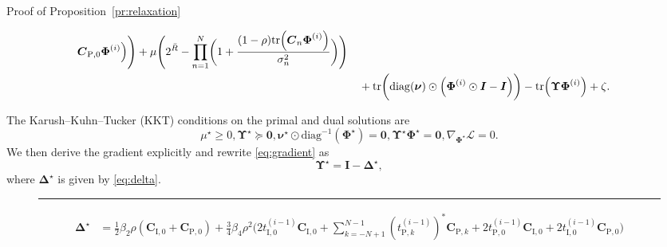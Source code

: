 \documentclass[journal]{IEEEtran}
\begin{document}
\begin{appendix}
\begin{subsection}{Proof of Proposition~\ref{pr:relaxation}}
\begin{figure}[!b]
\begin{align}
							\boldsymbol{C}_{\mathrm{P},0} \boldsymbol{\Phi}^{(i)}
						\Bigr)
						\Biggr) + \mu \Biggl(
						2^{\bar{R}} - \prod_{n=1}^N \biggl(
							1 + \frac{(1-\rho) \mathrm{tr}\Bigl(
								\boldsymbol{C}_n \boldsymbol{\Phi}^{(i)}
							\Bigr)}{\sigma_n^2}
						\biggr)
					\Biggr)\nonumber\\
					& \quad + \mathrm{tr}\biggl(
						\mathrm{diag}(\boldsymbol{\nu}) \odot \Bigl(
							\boldsymbol{\Phi}^{(i)} \odot \boldsymbol{I} - \boldsymbol{I}
						\Bigr)
					\biggr) - \mathrm{tr} \Bigl(
						\boldsymbol{\Upsilon} \boldsymbol{\Phi}^{(i)}
					\Bigr) + \zeta.
				\end{align}
			\end{figure}
			The Karush–Kuhn–Tucker (KKT) conditions on the primal and dual solutions are
			\begin{subequations}
				\begin{equation}\label{eq:lagrange_multiplier}
					\mu^\star \ge 0, \boldsymbol{\Upsilon}^\star \succeq \boldsymbol{0},
				\end{equation}
				\begin{equation}\label{eq:complementary_slackness}
					\boldsymbol{\nu}^\star \odot \mathrm{diag}^{-1}(\boldsymbol{\Phi}^\star) = \boldsymbol{0}, \boldsymbol{\Upsilon}^\star \boldsymbol{\Phi}^\star = \boldsymbol{0},
				\end{equation}
				\begin{equation}\label{eq:gradient}
					\nabla_{\boldsymbol{\Phi}^\star} \mathcal{L} = 0.
				\end{equation}
			\end{subequations}
			We then derive the gradient explicitly and rewrite \eqref{eq:gradient} as
			\begin{equation}
				\boldsymbol{\Upsilon}^\star = \boldsymbol{I} - \boldsymbol{\Delta}^\star,
			\end{equation}
			where $\boldsymbol{\Delta}^\star$ is given by \eqref{eq:delta}.
			\begin{figure}[!b]
				\hrule
				\begin{align}\label{eq:delta}
					\boldsymbol{\Delta}^\star
					& = \frac{1}{2} \beta_2 \rho (\boldsymbol{C}_{\mathrm{I},0}+\boldsymbol{C}_{\mathrm{P},0}) + \frac{3}{4} \beta_4 \rho^2
						\Biggl(
							2 t_{\mathrm{I},0}^{(i-1)} \boldsymbol{C}_{\mathrm{I},0} + \sum_{k=-N+1}^{N-1} (t_{\mathrm{P},k}^{(i-1)})^* \boldsymbol{C}_{\mathrm{P},k} + 2 t_{\mathrm{P},0}^{(i-1)} \boldsymbol{C}_{\mathrm{I},0} + 2 t_{\mathrm{I},0}^{(i-1)} \boldsymbol{C}_{\mathrm{P},0}
						\Biggr)\nonumber\\

\end{align}
\end{figure}
\end{subsection}
\end{appendix}
\end{document}
